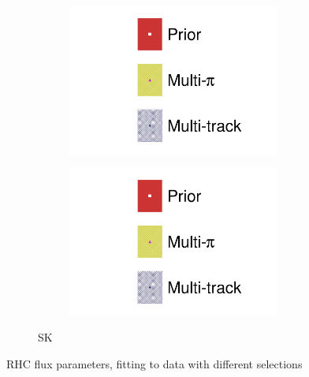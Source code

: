 \begin{figure}[h]
\begin{subfigure}[t]{\textwidth}
\begin{subfigure}[t]{0.24\textwidth}
		\includegraphics[width=\textwidth,page=16, trim={0mm 0mm 0mm 9mm}, clip]{figures/mach3/2018/data/2018a_FixedCov_RedCov_Mpi_Data_merg_2018a_NewDetMatrix_OrderSwitched_Data2to8_ActualData_merge}
	\end{subfigure}
	\begin{subfigure}[t]{0.24\textwidth}
		\includegraphics[width=\textwidth,page=17, trim={0mm 0mm 0mm 9mm}, clip]{figures/mach3/2018/data/2018a_FixedCov_RedCov_Mpi_Data_merg_2018a_NewDetMatrix_OrderSwitched_Data2to8_ActualData_merge}
	\end{subfigure}
\caption{SK}
\end{subfigure}
	\caption{RHC flux parameters, fitting to data with different selections}
	\label{fig:data_multitrack_multipi_rhc}
\end{figure}

